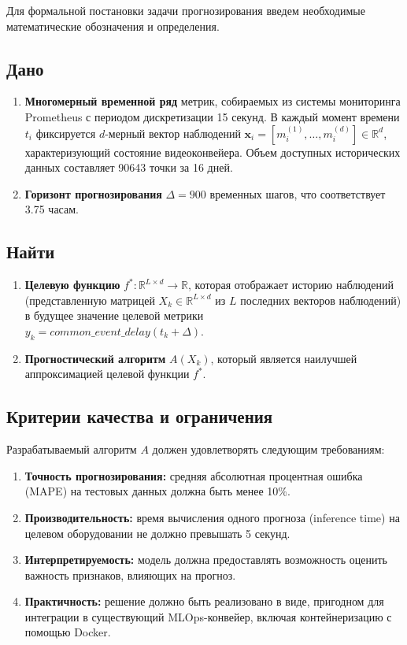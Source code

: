Для формальной постановки задачи прогнозирования введем необходимые математические обозначения и определения.

\subsection*{Дано}
\begin{enumerate}
	\item \textbf{Многомерный временной ряд} метрик, собираемых из системы мониторинга Prometheus с периодом дискретизации 15 секунд. В каждый момент времени $t_i$ фиксируется $d$-мерный вектор наблюдений $\mathbf{x}_i = [m^{(1)}_i, \dots, m^{(d)}_i] \in \mathbb{R}^d$, характеризующий состояние видеоконвейера. Объем доступных исторических данных составляет 90643 точки за 16 дней.
	\item \textbf{Горизонт прогнозирования} $\Delta = 900$ временных шагов, что соответствует 3.75 часам.
\end{enumerate}

\subsection*{Найти}
\begin{enumerate}
	\item \textbf{Целевую функцию} $f^*: \mathbb{R}^{L \times d} \to \mathbb{R}$, которая отображает историю наблюдений (представленную матрицей $X_k \in \mathbb{R}^{L \times d}$ из $L$ последних векторов наблюдений) в будущее значение целевой метрики \\
	$y_k = common\_event\_delay(t_k + \Delta)$.
	\item \textbf{Прогностический алгоритм} $A(X_k)$, который является наилучшей аппроксимацией целевой функции $f^*$.
\end{enumerate}

\subsection*{Критерии качества и ограничения}
Разрабатываемый алгоритм $A$ должен удовлетворять следующим требованиям:
\begin{enumerate}
	\item \textbf{Точность прогнозирования:} средняя абсолютная процентная ошибка (MAPE) на тестовых данных должна быть менее 10\%.
	\item \textbf{Производительность:} время вычисления одного прогноза (inference time) на целевом оборудовании не должно превышать 5 секунд.
	\item \textbf{Интерпретируемость:} модель должна предоставлять возможность оценить важность признаков, влияющих на прогноз.
	\item \textbf{Практичность:} решение должно быть реализовано в виде, пригодном для интеграции в существующий MLOps-конвейер, включая контейнеризацию с помощью Docker.
\end{enumerate}

